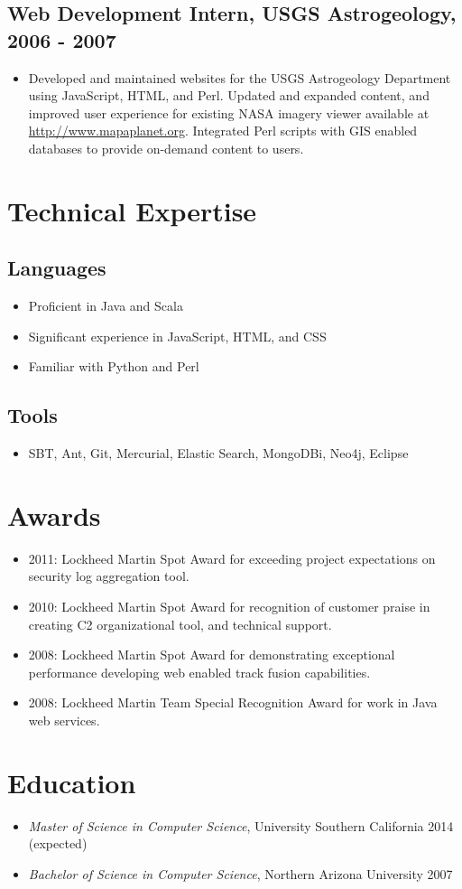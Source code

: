 \documentclass[11pt]{article}
\begin{document}
\subsection*{Web Development Intern, USGS Astrogeology, 2006 - 2007}
\label{sec-1.3}

\begin{itemize}
\item Developed and maintained websites for the USGS Astrogeology Department using JavaScript, HTML, and Perl. Updated and expanded content, and improved user experience for existing NASA imagery viewer available at \href{http://www.mapaplanet.org}{http://www.mapaplanet.org}. Integrated Perl scripts with GIS enabled databases to provide on-demand content to users.
\end{itemize}
\section*{Technical Expertise}
\label{sec-2}

\subsection*{Languages}
\label{sec-2.1}

\begin{itemize}
\item Proficient in Java and Scala
\item Significant experience in JavaScript, HTML, and CSS
\item Familiar with Python and Perl
\end{itemize}
\subsection*{Tools}
\label{sec-2.2}

\begin{itemize}
\item SBT, Ant, Git, Mercurial, Elastic Search, MongoDBi, Neo4j, Eclipse
\end{itemize}
\section*{Awards}
\label{sec-3}

\begin{itemize}
\item 2011: Lockheed Martin Spot Award for exceeding project expectations on security log aggregation tool.
\item 2010: Lockheed Martin Spot Award for recognition of customer praise in creating C2 organizational tool, and technical support.
\item 2008: Lockheed Martin Spot Award for demonstrating exceptional performance developing web enabled track fusion capabilities.
\item 2008: Lockheed Martin Team Special Recognition Award for work in Java web services.
\end{itemize}
\section*{Education}
\label{sec-4}

\begin{itemize}
\item \emph{Master of Science in Computer Science}, University Southern California 2014 (expected)
\item \emph{Bachelor of Science in Computer Science}, Northern Arizona University 2007
\end{itemize}
\end{document}

